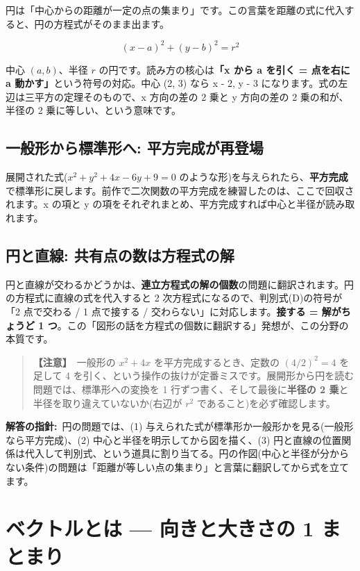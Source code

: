 \documentclass{article}
\begin{document}
円は「中心からの距離が一定の点の集まり」です。この言葉を距離の式に代入すると、円の方程式がそのまま出ます。

\[ (x - a)^{2} + (y - b)^{2} = r^{2} \]

中心 \( (a, b) \)、半径 \( r \) の円です。読み方の核心は\textbf{「x から a を引く = 点を右に a 動かす」}という符号の対応。中心 (2, 3) なら x - 2, y - 3 になります。式の左辺は三平方の定理そのもので、x 方向の差の 2 乗と y 方向の差の 2 乗の和が、半径の 2 乗に等しい、という意味です。

\subsection{一般形から標準形へ: 平方完成が再登場}

展開された式(\( x^{2} + y^{2} + 4x - 6y + 9 = 0 \) のような形)を与えられたら、\textbf{平方完成}で標準形に戻します。前作で二次関数の平方完成を練習したのは、ここで回収されます。x の項と y の項をそれぞれまとめ、平方完成すれば中心と半径が読み取れます。

\subsection{円と直線: 共有点の数は方程式の解}

円と直線が交わるかどうかは、\textbf{連立方程式の解の個数}の問題に翻訳されます。円の方程式に直線の式を代入すると 2 次方程式になるので、判別式(D)の符号が「2 点で交わる / 1 点で接する / 交わらない」に対応します。\textbf{接する = 解がちょうど 1 つ}。この「図形の話を方程式の個数に翻訳する」発想が、この分野の本質です。

\begin{quote}
\textbf{【注意】}\ 一般形の \( x^{2} + 4x \) を平方完成するとき、定数の \( (4/2)^{2} = 4 \) を足して 4 を引く、という操作の抜けが定番ミスです。展開形から円を読む問題では、標準形への変換を 1 行ずつ書く、そして最後に\textbf{半径の 2 乗}と半径を取り違えていないか(右辺が \( r^{2} \) であること)を必ず確認します。
\end{quote}

\textbf{解答の指針:}\ 円の問題では、(1) 与えられた式が標準形か一般形かを見る(一般形なら平方完成)、(2) 中心と半径を明示してから図を描く、(3) 円と直線の位置関係は代入して判別式、という道具に割り当てる。円の作図(中心と半径が分からない条件)の問題は「距離が等しい点の集まり」と言葉に翻訳してから式を立てます。

\section{ベクトルとは — 向きと大きさの 1 まとまり}
\end{document}
